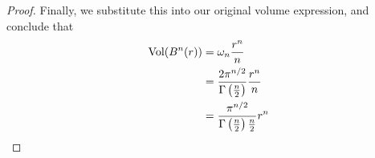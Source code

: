 \documentclass{exam}
\begin{document}
\begin{proof}
    Finally, we substitute this into our original volume expression, and conclude that
    \begin{align*}
        \text{Vol}(B^n(r)) &= \omega_n\frac{r^n}{n} \\
        &= \frac{2\pi^{n / 2}}{\Gamma \left( \frac{n}{2} \right)} \frac{r^n}{n} \\
        &= \frac{\pi^{n / 2}}{\Gamma \left( \frac{n}{2} \right) \frac{n}{2}} r^n
    \end{align*}
    
\end{proof}
\end{document}
